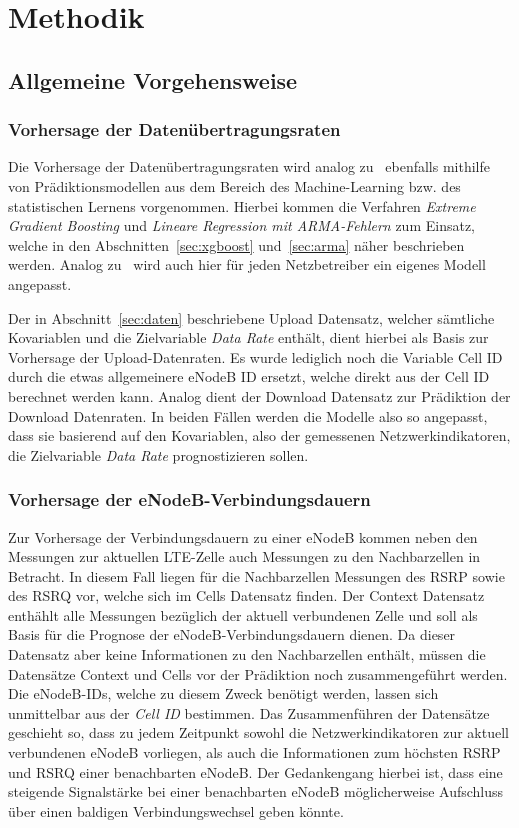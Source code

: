 \section{Methodik}

\subsection{Allgemeine Vorgehensweise}

\subsubsection{Vorhersage der Daten\"ubertragungsraten}

Die Vorhersage der Daten\"ubertragungsraten wird analog zu~\cite{IEEE} ebenfalls mithilfe von
Pr\"adiktionsmodellen aus dem Bereich des Machine-Learning bzw. des statistischen Lernens vorgenommen.
Hierbei kommen die Verfahren \textit{Extreme Gradient Boosting} und \textit{Lineare Regression mit ARMA-Fehlern}
zum Einsatz, welche in den Abschnitten~\ref{sec:xgboost} und~\ref{sec:arma} n\"aher beschrieben werden.
Analog zu~\cite{IEEE} wird auch hier f\"ur jeden Netzbetreiber ein eigenes Modell angepasst.

Der in Abschnitt~\ref{sec:daten} beschriebene Upload Datensatz, welcher s\"amtliche Kovariablen und die Zielvariable
\textit{Data Rate} enth\"alt, dient hierbei als Basis zur Vorhersage der Upload-Datenraten.
Es wurde lediglich noch die Variable Cell ID durch die etwas allgemeinere eNodeB ID ersetzt, welche direkt aus der Cell ID
berechnet werden kann.
Analog dient der Download Datensatz zur Pr\"adiktion der Download Datenraten.
In beiden F\"allen werden die Modelle also so angepasst, dass sie basierend auf den Kovariablen, also der gemessenen Netzwerkindikatoren,
die Zielvariable \textit{Data Rate} prognostizieren sollen.

\subsubsection{Vorhersage der eNodeB-Verbindungsdauern}

Zur Vorhersage der Verbindungsdauern zu einer eNodeB kommen neben den Messungen zur aktuellen LTE-Zelle auch Messungen
zu den Nachbarzellen in Betracht. In diesem Fall liegen f\"ur die Nachbarzellen Messungen des RSRP sowie des RSRQ vor,
welche sich im Cells Datensatz finden. Der Context Datensatz enth\"ahlt alle Messungen bez\"uglich der aktuell verbundenen
Zelle und soll als Basis f\"ur die Prognose der eNodeB-Verbindungsdauern dienen. Da dieser Datensatz aber keine Informationen
zu den Nachbarzellen enth\"alt, m\"ussen die Datens\"atze Context und Cells vor der Pr\"adiktion noch zusammengef\"uhrt werden.
Die eNodeB-IDs, welche zu diesem Zweck ben\"otigt werden, lassen sich unmittelbar aus der \textit{Cell ID} bestimmen.
Das Zusammenf\"uhren der Datens\"atze geschieht so,
dass zu jedem Zeitpunkt sowohl die Netzwerkindikatoren zur aktuell verbundenen eNodeB vorliegen, als auch die
Informationen zum h\"ochsten RSRP und RSRQ einer benachbarten eNodeB.
Der Gedankengang hierbei ist, dass eine steigende Signalst\"arke bei einer benachbarten eNodeB m\"oglicherweise Aufschluss \"uber einen
baldigen Verbindungswechsel geben k\"onnte.

